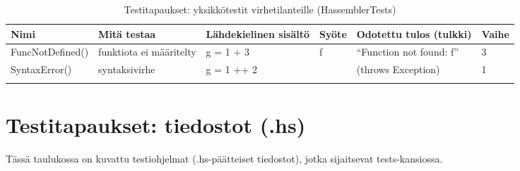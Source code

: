 \documentclass[11pt]{article} %
\begin{document}
\begin{table}[!htbp] %
\caption{Testitapaukset: yksikkötestit virhetilanteille (HassemblerTests)}
\begin{tabular}{|p{3cm}|p{3cm}|p{3cm}|p{}|p{3cm}|p{3cm}|}
\hline
\textbf{Nimi} & \textbf{Mitä testaa} & \textbf{Lähdekielinen sisältö} & \textbf{Syöte}  & \textbf{Odotettu tulos (tulkki)}  & \textbf{Vaihe} \\ \hline
 FuncNotDefined()  & funktiota ei määritelty   &  g = 1 + 3       &  f       &  ``Function not found: f''   &  3            \\ \hline
 SyntaxError()     & syntaksivirhe   &  g = 1 ++ 2    &           &   (throws Exception)   &    1     \\ \hline
              &                      &                       &           &                      &                            \\ \hline
              
             
\end{tabular}
\end{table}


\section{Testitapaukset: tiedostot (.hs)}


Tässä taulukossa on kuvattu testiohjelmat (.hs-päätteiset tiedostot), jotka sijaitsevat tests-kansiossa.
\end{document}
